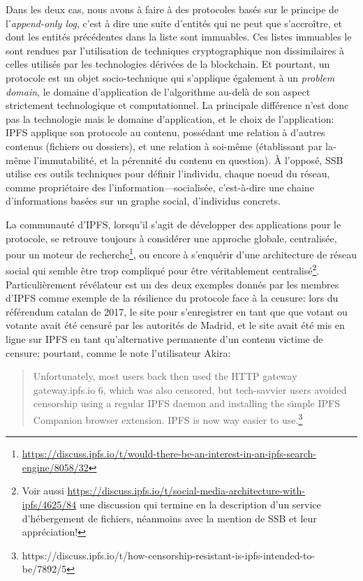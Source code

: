 \documentclass{article}
\begin{document}
Dans les deux cas, nous avons à faire à des protocoles basés sur le principe de l'\emph{append-only log}, c'est à dire une suite d'entités qui ne peut que s'accroître, et dont les entités précédentes dans la liste sont immuables. Ces listes immuables le sont rendues par l'utilisation de techniques cryptographique non dissimilaires à celles utilisés par les technologies dérivées de la blockchain. Et pourtant, un protocole est un objet socio-technique qui s'applique également à un \emph{problem domain}, le domaine d'application de l'algorithme au-delà de son aspect strictement technologique et computationnel. La principale différence n'est donc pas la technologie mais le domaine d'application, et le choix de l'application: IPFS applique son protocole au contenu, possédant une relation à d'autres contenus (fichiers ou dossiers), et une relation à soi-même (établissant par la-même l'immutabilité, et la pérennité du contenu en question). À l'opposé, SSB utilise ces outils techniques pour définir l'individu, chaque noeud du réseau, comme propriétaire des l'information—socialisée, c'est-à-dire une chaine d'informations basées sur un graphe social, d'individus concrets.

La communauté d'IPFS, lorsqu'il s'agit de développer des applications pour le protocole, se retrouve toujours à considérer une approche globale, centralisée, pour un moteur de recherche\footnote{\url{https://discuss.ipfs.io/t/would-there-be-an-interest-in-an-ipfs-search-engine/8058/32}}, ou encore à s'enquérir d'une architecture de réseau social qui semble être trop compliqué pour être véritablement centralisé\footnote{Voir aussi \url{https://discuss.ipfs.io/t/social-media-architecture-with-ipfs/4625/84} une discussion qui termine en la description d'un service d'hébergement de fichiers, néanmoins avec la mention de SSB et leur appréciation!}. Particulièrement révélateur est un des deux exemples donnés par les membres d'IPFS comme exemple de la résilience du protocole face à la censure: lors du référendum catalan de 2017, le site pour s'enregistrer en tant que que votant ou votante avait été censuré par les autorités de Madrid, et le site avait été mis en ligne sur IPFS en tant qu'alternative permanente d'un contenu victime de censure; pourtant, comme le note l'utilisateur Akira:

\begin{quote}
    Unfortunately, most users back then used the HTTP gateway gateway.ipfs.io 6, which was also censored, but tech-savvier users avoided censorship using a regular IPFS daemon and installing the simple IPFS Companion browser extension. IPFS is now way easier to use.\footnote{https://discuss.ipfs.io/t/how-censorship-resistant-is-ipfs-intended-to-be/7892/5}
\end{quote}
\end{document}
